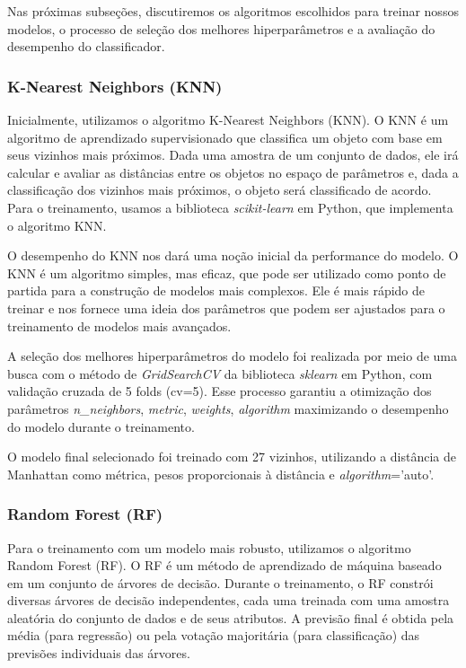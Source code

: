 Nas próximas subseções, discutiremos os algoritmos escolhidos para treinar nossos modelos, o processo de seleção dos melhores hiperparâmetros e a avaliação do desempenho do classificador.

\subsubsection*{K-Nearest Neighbors (KNN)}\label{subsubsec:knn}
Inicialmente, utilizamos o algoritmo K-Nearest Neighbors (KNN). O KNN é um algoritmo de aprendizado supervisionado que classifica um objeto com base em seus vizinhos mais próximos. Dada uma amostra de um conjunto de dados, ele irá calcular e avaliar as distâncias entre os objetos no espaço de parâmetros e, dada a classificação dos vizinhos mais próximos, o objeto será classificado de acordo. Para o treinamento, usamos a biblioteca \textit{scikit-learn} em Python, que implementa o algoritmo KNN.

O desempenho do KNN nos dará uma noção inicial da performance do modelo. O KNN é um algoritmo simples, mas eficaz, que pode ser utilizado como ponto de partida para a construção de modelos mais complexos. Ele é mais rápido de treinar e nos fornece uma ideia dos parâmetros que podem ser ajustados para o treinamento de modelos mais avançados.

A seleção dos melhores hiperparâmetros do modelo foi realizada por meio de uma busca com o método de \textit{GridSearchCV} da biblioteca \textit{sklearn} em Python, com validação cruzada de 5 folds (cv=5). Esse processo garantiu a otimização dos parâmetros \textit{n\_neighbors}, \textit{metric}, \textit{weights}, \textit{algorithm} maximizando o desempenho do modelo durante o treinamento.

O modelo final selecionado foi treinado com 27 vizinhos, utilizando a distância de Manhattan como métrica, pesos proporcionais à distância e \textit{algorithm}='auto'.

\subsubsection*{Random Forest (RF)}\label{subsubsec:rf}
Para o treinamento com um modelo mais robusto, utilizamos o algoritmo Random Forest (RF). O \ac{RF} é um método de aprendizado de máquina baseado em um conjunto de árvores de decisão. Durante o treinamento, o \ac{RF} constrói diversas árvores de decisão independentes, cada uma treinada com uma amostra aleatória do conjunto de dados e de seus atributos. A previsão final é obtida pela média (para regressão) ou pela votação majoritária (para classificação) das previsões individuais das árvores.

